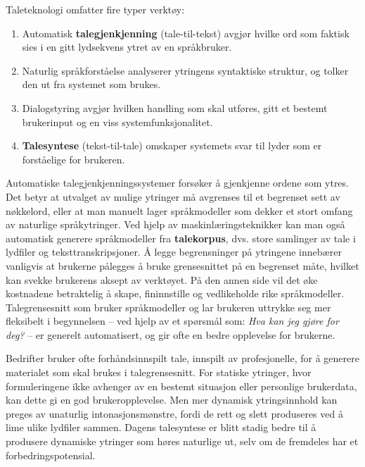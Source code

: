 \begin{multicols}{2}
Taleteknologi omfatter fire typer verktøy: 

\begin{enumerate}
\item Automatisk \textbf{talegjenkjenning} (tale-til-tekst) avgjør hvilke ord som faktisk sies i en gitt lydsekvens ytret av en språkbruker.
\item Naturlig språkforståelse analyserer ytringens syntaktiske struktur, og tolker den ut fra systemet som brukes. 
\item Dialogstyring avgjør hvilken handling som skal utføres, gitt et bestemt brukerinput og en viss systemfunksjonalitet.
\item \textbf{Talesyntese} (tekst-til-tale) omskaper systemets svar til lyder som er forståelige for brukeren.
\end{enumerate}

Automatiske talegjenkjenningssystemer forsøker å gjenkjenne ordene som ytres. Det betyr at utvalget av mulige ytringer må avgrenses til et begrenset sett av nøkkelord, eller at man manuelt lager språkmodeller som dekker et stort omfang av naturlige språkytringer. Ved hjelp av maskinlæringsteknikker kan man også automatisk generere språkmodeller fra \textbf{talekorpus}, dvs. store samlinger av tale i lydfiler og teksttranskripsjoner. Å legge begrensninger på ytringene innebærer vanligvis at brukerne pålegges å bruke grensesnittet på en begrenset måte, hvilket kan svekke brukerens aksept av verktøyet. På den annen side vil det øke kostnadene betraktelig å skape, fininnstille og vedlikeholde rike språkmodeller. Talegrensesnitt som bruker språkmodeller og lar brukeren uttrykke seg mer fleksibelt i begynnelsen – ved hjelp av et spørsmål som: \textit{Hva kan jeg gjøre for deg?} – er generelt automatisert, og gir ofte en bedre opplevelse for brukerne. 


Bedrifter bruker ofte forhåndsinnspilt tale, innspilt av  profesjonelle, for å generere materialet som skal brukes i talegrensesnitt. For statiske ytringer, hvor formuleringene ikke avhenger av en bestemt situasjon eller personlige brukerdata, kan dette gi en god brukeropplevelse. Men mer dynamisk ytringsinnhold kan preges av unaturlig intonasjonsmønstre, fordi de rett og slett produseres ved å lime ulike lydfiler sammen. Dagens talesyntese er blitt stadig bedre til å produsere dynamiske ytringer som høres naturlige ut, selv om de fremdeles har et forbedringspotensial. 


\end{multicols}
